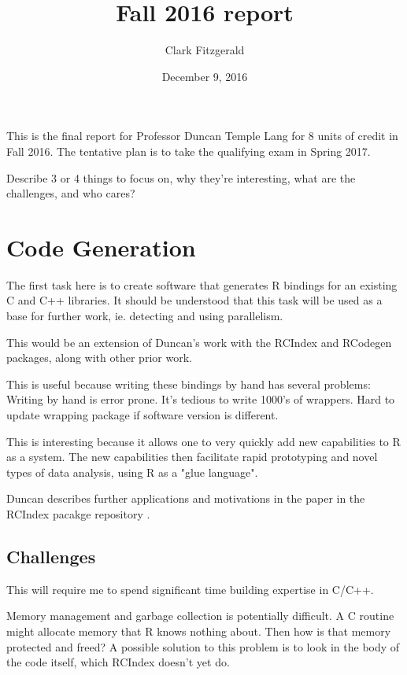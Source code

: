 \documentclass[12pt]{article}
\begin{document}
\title{Fall 2016 report}
\date{December 9, 2016}
\author{Clark Fitzgerald}
\maketitle

This is the final report for Professor Duncan Temple Lang for 8 units of
credit in Fall 2016.  The tentative plan is to take the qualifying exam in
Spring 2017.

\begin{emph}
Describe 3 or 4 things to focus on, why they're interesting, what are the
challenges, and who cares?
\end{emph}


\section{Code Generation}

The first task here is to create software that generates R bindings for an
existing C and C++ libraries. 
It should be understood that this task will be used as a base for
further work, ie. detecting and using parallelism.

This would be an extension of Duncan's work with the RCIndex \cite{R-RCIndex} and
RCodegen \cite{R-RCodegen} packages, along with other prior work.

This is useful because writing these bindings by hand
has several problems: 
Writing by hand is error prone.
It's tedious to write 1000's of wrappers.
Hard to update wrapping package if software version is different.

This is interesting because it allows one to very quickly add new
capabilities to R as a system. The new capabilities then facilitate rapid
prototyping and novel types of data analysis, using R as a "glue language".

Duncan describes further applications and motivations in the paper in
the RCIndex pacakge repository \cite{R-RCIndex}.

\subsection{Challenges}

This will require me to spend significant time building expertise in C/C++.

Memory management and garbage collection is potentially difficult. A C routine might allocate
memory that R knows nothing about. Then how is that memory protected and freed? A
possible solution to this problem is to look in the body of the code
itself, which RCIndex doesn't yet do.
\end{document}
